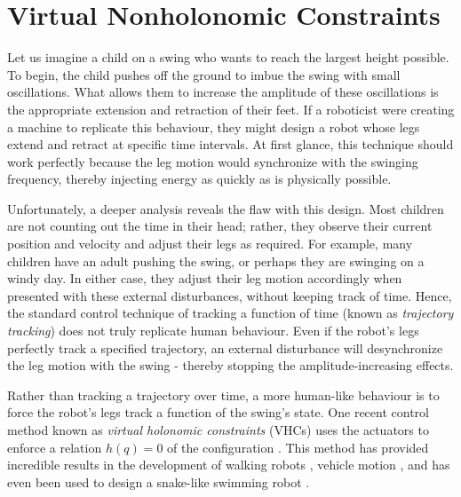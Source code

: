 \section{Virtual Nonholonomic Constraints}
Let us imagine a child on a swing who wants to reach the largest height
possible. 
To begin, the child pushes off the ground to imbue the swing with small oscillations.
What allows them to increase the amplitude of these oscillations is the
appropriate extension and retraction of their feet.
If a roboticist were creating a machine to replicate this behaviour, they might
design a robot whose legs extend and retract at specific time intervals. 
At first glance, this technique should work perfectly because the leg motion
would synchronize with the swinging frequency, thereby injecting energy as
quickly as is physically possible.

Unfortunately, a deeper analysis reveals the flaw with this design.
Most children are not counting out the time in their head; rather, they observe
their current position and velocity and adjust their legs as required. 
For example, many children have an adult pushing the swing, or perhaps
they are swinging on a windy day. In either case, they adjust their leg
motion accordingly when presented with these external disturbances, without
keeping track of time. 
Hence, the standard control technique of tracking a function of time (known as
\textit{trajectory tracking}) does not truly replicate human behaviour.
Even if the robot's legs perfectly track a specified trajectory, 
an external disturbance will desynchronize the leg motion
with the swing - thereby stopping the amplitude-increasing effects.


Rather than tracking a trajectory over time, a more human-like behaviour 
is to force the robot's legs track a function of the swing's state. 
One recent control method known as \textit{virtual holonomic constraints} (VHCs)
uses the actuators to enforce a relation \(h(q) = 0\) of the configuration
\cite{vhcs_for_el_systems}. 
This method has provided incredible results in the development of 
walking robots \cite{vhc_robotic_walking, vhc_stable_walking}, 
vehicle motion \cite{vhc_bicycle, vhc_helicopter}, 
and has even been used to design a snake-like swimming robot
\cite{vhc_snake}.

